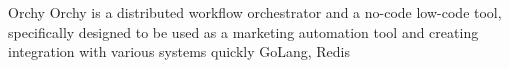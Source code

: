 %
%
%


\begin{projects}
	\project
	{Orchy}{}
	{}
	{Orchy is a distributed workflow orchestrator and a no-code low-code tool, specifically designed to be used as a marketing automation tool and creating integration with various systems quickly}
	{GoLang, Redis}
\end{projects}